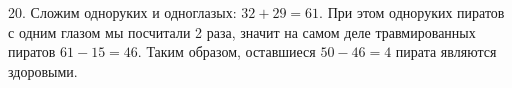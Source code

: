 20. Сложим одноруких и одноглазых: $32+29=61.$ При этом одноруких пиратов с одним глазом мы посчитали 2 раза, значит на самом деле травмированных пиратов $61-15=46.$ Таким образом, оставшиеся $50-46=4$ пирата являются здоровыми.\\
